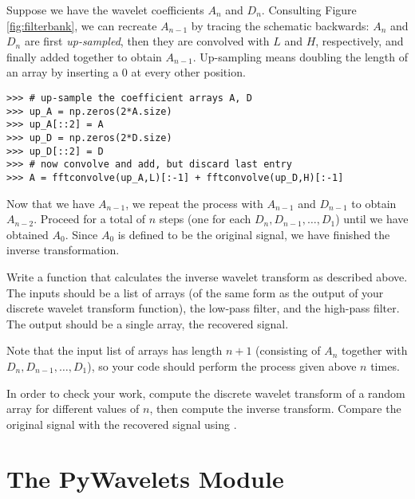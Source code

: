 Suppose we have the wavelet coefficients $A_n$ and $D_n$. Consulting Figure \ref{fig:filterbank},
we can recreate $A_{n-1}$ by tracing the schematic backwards: $A_n$ and $D_n$ are first
\emph{up-sampled}, then they are convolved with $L$ and $H$, respectively, and finally
added together to obtain $A_{n-1}$. Up-sampling means doubling the length of an array
by inserting a 0 at every other position.


\begin{lstlisting}
>>> # up-sample the coefficient arrays A, D
>>> up_A = np.zeros(2*A.size)
>>> up_A[::2] = A
>>> up_D = np.zeros(2*D.size)
>>> up_D[::2] = D
>>> # now convolve and add, but discard last entry
>>> A = fftconvolve(up_A,L)[:-1] + fftconvolve(up_D,H)[:-1]
\end{lstlisting}

Now that we have $A_{n-1}$, we repeat the process with $A_{n-1}$ and $D_{n-1}$ to obtain
$A_{n-2}$. Proceed for a total of $n$ steps (one for each $D_n, D_{n-1},\ldots ,D_1$) until we have obtained $A_0$.
Since $A_0$ is defined to be the original
signal, we have finished the inverse transformation.

\begin{problem} %
Write a function that calculates the inverse wavelet transform as described above.
The inputs should be a list of arrays (of the same form as the output of your discrete
wavelet transform function), the low-pass filter, and the high-pass filter.
The output should be a single array, the recovered signal.

Note that the input list of arrays has length $n+1$ (consisting of $A_n$ together with
$D_n, D_{n-1}, \ldots, D_1$), so your code should perform the process given above $n$ times.

In order to check your work, compute
the discrete wavelet transform of a random array for different values of $n$, then compute the inverse
transform.
Compare the original signal with the recovered signal using .
\end{problem}

\newpage

\section*{The PyWavelets Module} %

